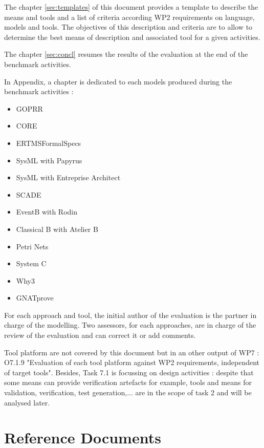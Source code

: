 The chapter \ref{sec:templates} of this document provides a template to describe the means and tools and a list of criteria according WP2 requirements on language, models and tools. The objectives of this description and criteria are to allow to determine the best means of description and associated tool for a given activities.

The chapter \ref{sec:concl} resumes the results of the evaluation at the end of the benchmark activities.

In Appendix, a chapter is dedicated to each models produced during the benchmark activities :
\begin{itemize}
\item  GOPRR
\item  CORE
\item  ERTMSFormalSpecs
\item  SysML with Papyrus
\item  SysML with Entreprise Architect
\item  SCADE
\item  EventB with Rodin
\item  Classical B with Atelier B
\item  Petri Nets
\item  System C
\item  Why3
\item  GNATprove
\end{itemize}

For each approach and tool, the initial  author of the evaluation is the partner in charge of the modelling. Two assessors, for each approaches,  are in charge of the review of the evaluation and can correct it or add comments.

Tool platform are not covered by this document but in an other output of WP7 :  O7.1.9 "Evaluation of each tool platform against WP2 requirements, independent of target tools".
Besides, Task 7.1 is focussing on design activities : despite that some means can provide verification artefacts for example,  tools and means for validation, verification, test generation,... are in the scope of task 2 and will be analysed later.



\section{Reference Documents}
\label{sec:ref}

